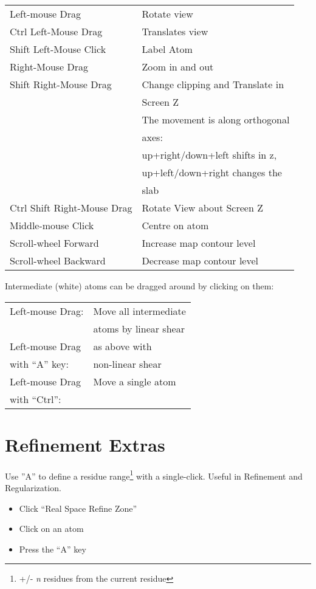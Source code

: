 \documentclass[twocolumn]{article}
\begin{document}
  \begin{tabular}{ll}
    Left-mouse Drag & Rotate view \\
    Ctrl Left-Mouse Drag &  Translates view \\
    Shift Left-Mouse Click &  Label Atom\\
    Right-Mouse Drag &  Zoom in and out\index{zoom}\\
    Shift Right-Mouse Drag & Change clipping and Translate in \\
                           & Screen Z \\
                           & The movement is along orthogonal \\
                           & axes: \\
                           & up+right/down+left shifts in z, \\ 
                           &  up+left/down+right changes the \\
                           & slab \\
    Ctrl Shift Right-Mouse Drag &  Rotate View about Screen Z\\
    Middle-mouse Click & Centre on atom\\
    Scroll-wheel Forward &  Increase map contour level\\
    Scroll-wheel Backward &  Decrease map contour level
  \end{tabular}

  \vspace{5mm}
  Intermediate (white) atoms can be dragged around by clicking on
  them:

  \vspace{5mm}
\begin{tabular}{ll}
 Left-mouse Drag:     & Move all intermediate \\
                      & atoms by linear shear \\
 Left-mouse Drag  & as above with\\
  with ``A'' key:
                                 &  non-linear shear\\
 Left-mouse Drag & Move a single atom\\
 with ``Ctrl'': 
\end{tabular}

\section{Refinement Extras}
Use ''A'' to define a residue range\footnote{+/- \emph{n} residues
  from the current residue} with a single-click. Useful in Refinement
and Regularization.

\begin{itemize}
\item Click ``Real Space Refine Zone''
\item Click on an atom
\item Press the ``A'' key
\end{itemize}
\end{document}
